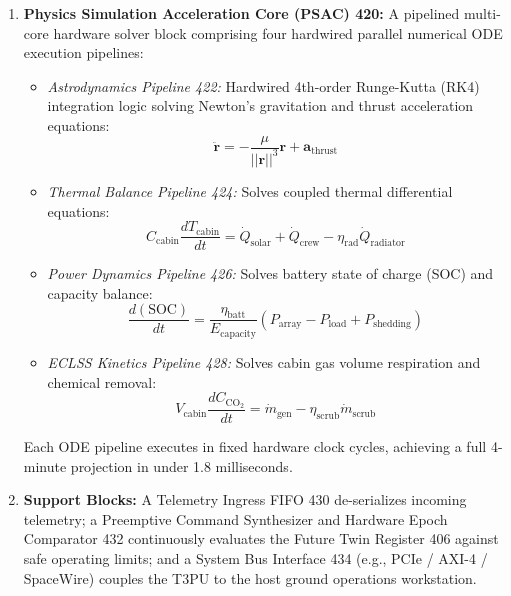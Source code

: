 \documentclass[12pt,a4paper]{article}
\begin{document}
\begin{enumerate}
    \item \textbf{Physics Simulation Acceleration Core (PSAC) 420:} A pipelined multi-core hardware solver block comprising four hardwired parallel numerical ODE execution pipelines:
    \begin{itemize}
        \item \textit{Astrodynamics Pipeline 422:} Hardwired 4th-order Runge-Kutta (RK4) integration logic solving Newton's gravitation and thrust acceleration equations:
        \begin{equation}
            \mathbf{\ddot{r}} = -\frac{\mu}{||\mathbf{r}||^3}\mathbf{r} + \mathbf{a}_{\text{thrust}}
        \end{equation}
        \item \textit{Thermal Balance Pipeline 424:} Solves coupled thermal differential equations:
        \begin{equation}
            C_{\text{cabin}} \frac{dT_{\text{cabin}}}{dt} = \dot{Q}_{\text{solar}} + \dot{Q}_{\text{crew}} - \eta_{\text{rad}} \dot{Q}_{\text{radiator}}
        \end{equation}
        \item \textit{Power Dynamics Pipeline 426:} Solves battery state of charge (SOC) and capacity balance:
        \begin{equation}
            \frac{d(\text{SOC})}{dt} = \frac{\eta_{\text{batt}}}{E_{\text{capacity}}} \left( P_{\text{array}} - P_{\text{load}} + P_{\text{shedding}} \right)
        \end{equation}
        \item \textit{ECLSS Kinetics Pipeline 428:} Solves cabin gas volume respiration and chemical removal:
        \begin{equation}
            V_{\text{cabin}} \frac{dC_{\text{CO}_2}}{dt} = \dot{m}_{\text{gen}} - \eta_{\text{scrub}} \dot{m}_{\text{scrub}}
        \end{equation}
    \end{itemize}
    Each ODE pipeline executes in fixed hardware clock cycles, achieving a full 4-minute projection in under 1.8 milliseconds.
    
    \item \textbf{Support Blocks:} A Telemetry Ingress FIFO 430 de-serializes incoming telemetry; a Preemptive Command Synthesizer and Hardware Epoch Comparator 432 continuously evaluates the Future Twin Register 406 against safe operating limits; and a System Bus Interface 434 (e.g., PCIe / AXI-4 / SpaceWire) couples the T3PU to the host ground operations workstation.
\end{enumerate}
\end{document}
